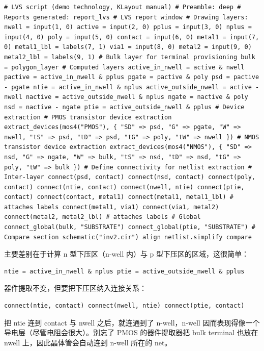 \begin{lstlisting}
# LVS script (demo technology, KLayout manual) # Preamble: deep # Reports generated: report_lvs # LVS report window # Drawing layers: nwell = input(1, 0) active = input(2, 0) pplus = input(3, 0) nplus = input(4, 0) poly = input(5, 0) contact = input(6, 0) metal1 = input(7, 0) metal1_lbl = labels(7, 1) via1 = input(8, 0) metal2 = input(9, 0) metal2_lbl = labels(9, 1) # Bulk layer for terminal provisioning bulk = polygon_layer # Computed layers active_in_nwell = active & nwell pactive = active_in_nwell & pplus pgate = pactive & poly psd = pactive - pgate ntie = active_in_nwell & nplus active_outside_nwell = active - nwell nactive = active_outside_nwell & nplus ngate = nactive & poly nsd = nactive - ngate ptie = active_outside_nwell & pplus # Device extraction # PMOS transistor device extraction extract_devices(mos4("PMOS"), { "SD" => psd, "G" => pgate, "W" => nwell, "tS" => psd, "tD" => psd, "tG" => poly, "tW" => nwell }) # NMOS transistor device extraction extract_devices(mos4("NMOS"), { "SD" => nsd, "G" => ngate, "W" => bulk, "tS" => nsd, "tD" => nsd, "tG" => poly, "tW" => bulk }) # Define connectivity for netlist extraction # Inter-layer connect(psd, contact) connect(nsd, contact) connect(poly, contact) connect(ntie, contact) connect(nwell, ntie) connect(ptie, contact) connect(contact, metal1) connect(metal1, metal1_lbl) # attaches labels connect(metal1, via1) connect(via1, metal2) connect(metal2, metal2_lbl) # attaches labels # Global connect_global(bulk, "SUBSTRATE") connect_global(ptie, "SUBSTRATE") # Compare section schematic("inv2.cir") align netlist.simplify compare
\end{lstlisting}

主要差别在于计算 n 型下压区（n-well 内）与 p 型下压区的区域，这很简单：

\begin{lstlisting}
ntie = active_in_nwell & nplus ptie = active_outside_nwell & pplus
\end{lstlisting}

器件提取不变，但要把下压区纳入连接关系：

\begin{lstlisting}
connect(ntie, contact) connect(nwell, ntie) connect(ptie, contact)
\end{lstlisting}

把 ntie 连到 contact 与 nwell 之后，就连通到了 n-well，n-well 因而表现得像一个导电层（尽管电阻会很大）。别忘了 PMOS 的器件提取器把 bulk terminal 也放在 nwell 上，因此晶体管会自动连到 n-well 所在的 net。

